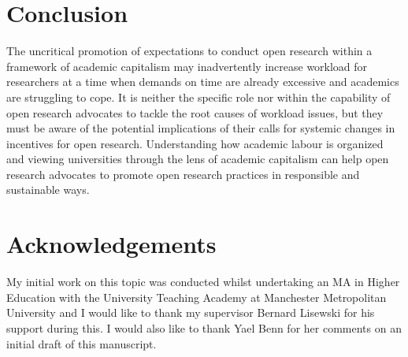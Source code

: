 \documentclass[ authordate, meta, issue]{jote-new-article}
\begin{document}
\section{Conclusion}



The uncritical promotion of expectations to conduct open research within a framework of academic capitalism may inadvertently increase workload for researchers at a time when demands on time are already excessive and academics are struggling to cope. It is neither the specific role nor within the capability of open research advocates to tackle the root causes of workload issues, but they must be aware of the potential implications of their calls for systemic changes in incentives for open research. Understanding how academic labour is organized and viewing universities through the lens of academic capitalism can help open research advocates to promote open research practices in responsible and sustainable ways.



\section{Acknowledgements}



My initial work on this topic was conducted whilst undertaking an MA in Higher Education with the University Teaching Academy at Manchester Metropolitan University and I would like to thank my supervisor Bernard Lisewski for his support during this. I would also like to thank Yael Benn for her comments on an initial draft of this manuscript.








\printbibliography
\end{document}
